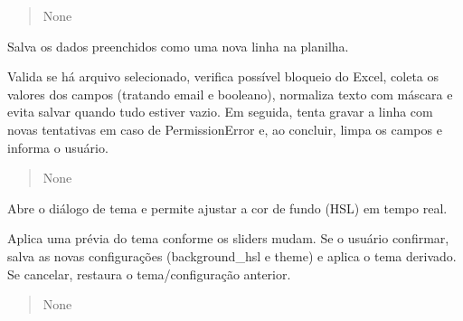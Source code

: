 \documentclass[letterpaper,10pt,english]{sphinxmanual}
\begin{document}
\begin{fulllineitems}
\begin{fulllineitems}
\begin{quote}
\begin{description}
\sphinxAtStartPar
None

\end{description}\end{quote}

\end{fulllineitems}


\begin{fulllineitems}
\label{\detokenize{api/app:app.App.save_lead}}
\pysigstartsignatures
\pysiglinewithargsret
{}
{}
{}
\pysigstopsignatures
\sphinxAtStartPar
Salva os dados preenchidos como uma nova linha na planilha.

\sphinxAtStartPar
Valida se há arquivo selecionado, verifica possível bloqueio do Excel,
coleta os valores dos campos (tratando e\sphinxhyphen{}mail e booleano), normaliza texto
com máscara e evita salvar quando tudo estiver vazio. Em seguida, tenta
gravar a linha com novas tentativas em caso de PermissionError e, ao
concluir, limpa os campos e informa o usuário.
\begin{quote}\begin{description}
\sphinxAtStartPar
{}

\sphinxAtStartPar
None

\end{description}\end{quote}

\end{fulllineitems}


\begin{fulllineitems}
\label{\detokenize{api/app:app.App.open_theme_settings}}
\pysigstartsignatures
\pysiglinewithargsret
{}
{}
{}
\pysigstopsignatures
\sphinxAtStartPar
Abre o diálogo de tema e permite ajustar a cor de fundo (HSL) em tempo real.

\sphinxAtStartPar
Aplica uma prévia do tema conforme os sliders mudam. Se o usuário confirmar,
salva as novas configurações (background\_hsl e theme) e aplica o tema
derivado. Se cancelar, restaura o tema/configuração anterior.
\begin{quote}\begin{description}
\sphinxAtStartPar
{}

\sphinxAtStartPar
None

\end{description}\end{quote}

\end{fulllineitems}


\end{fulllineitems}
\end{document}
